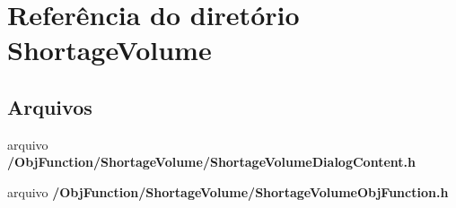 \section{Referência do diretório Shortage\+Volume}
\label{dir_5ef537c96858a16a0537b48133d42397}
\subsection*{Arquivos}
\begin{DoxyCompactItemize}
\item 
arquivo {\bf /\+Obj\+Function/\+Shortage\+Volume/\+Shortage\+Volume\+Dialog\+Content.\+h}
\item 
arquivo {\bf /\+Obj\+Function/\+Shortage\+Volume/\+Shortage\+Volume\+Obj\+Function.\+h}
\end{DoxyCompactItemize}
